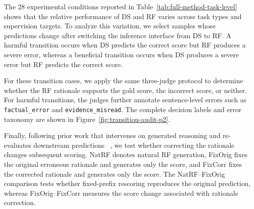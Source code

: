 %
%

The 28 experimental conditions reported in
Table~\ref{tab:full-method-task-level} shows that the relative performance
of DS and RF varies across task types and supervision targets. To
analyze this variation, we select samples whose predictions change
after switching the inference interface from DS to RF. A harmful
transition occurs when DS predicts the correct score but RF produces
a severe error, whereas a beneficial transition occurs when DS
produces a severe error but RF predicts the correct score.

For these transition cases, we apply the same three-judge protocol
to determine whether the RF rationale supports the gold score, the
incorrect score, or neither. For harmful transitions, the judges
further annotate sentence-level errors such as
\texttt{factual\_error} and \texttt{evidence\_misread}. The complete
decision labels and error taxonomy are shown in
Figure~\ref{fig:transition-audit-p2}.

Finally, following prior work that intervenes on generated reasoning
and re-evaluates downstream predictions
~\citep{lanham-etal-2023-measuring,
li-chaturvedi-2026-inter-dimension}, we test whether correcting the
rationale changes subsequent scoring. NatRF denotes natural RF
generation, FixOrig fixes the
original erroneous rationale and generates only the score, and
FixCorr fixes the corrected rationale and generates only the score.
The NatRF--FixOrig comparison tests whether fixed-prefix rescoring
reproduces the original prediction, whereas FixOrig--FixCorr measures
the score change associated with rationale correction.

